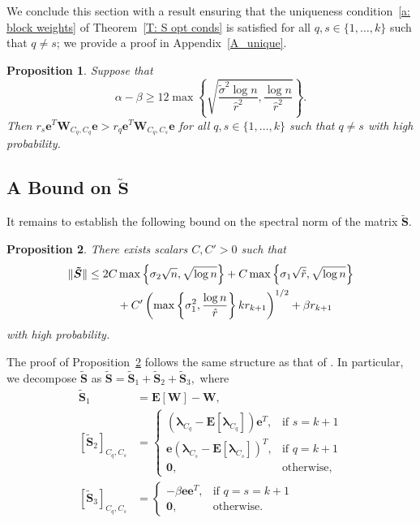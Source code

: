 \documentclass[twoside,11pt]{article}
\newtheorem{proposition}{Proposition}[section]
\newcommand{\E}{\mathbf{E}}
\newcommand{\St}{\bs{\tilde S}}
\newcommand{\e}{\bs {e}}
\newcommand{\bs}{\boldsymbol}
\newcommand{\W}{\bs {W}}
\newcommand{\0}{\bs{0}}
\newcommand{\sbra}[1] {\ensuremath{ \left[ #1\right]}} %
\newcommand{\rbra}[1]{\ensuremath{\left( #1 \right)}} %
\newcommand{\bra}[1]{\ensuremath{\left\{ #1 \right\}}} %
\begin{document}
{%
We conclude this section with a result ensuring that the uniqueness condition~\eqref{a: block weights} of 
Theorem~\ref{T: S opt conds}
is satisfied for all \(q, s\in \{1,\dots, k\}\) such that \(q \neq s\); 
we provide a proof in Appendix~\ref{A_unique}.

\begin{proposition} 
\label{prop:unique}%
	Suppose that
	\begin{equation} \label{eq: unique bound}
		\alpha - \beta \ge
		12 \max \bra{ \sqrt{ \frac{\tilde \sigma^2 \log n}{\hat r^2}, 
		\frac{\log n}{\hat r^2} } }.
	\end{equation}
	Then \(r_s \e^T \W_{C_q, C_q} \e > r_q \e^T \W_{C_q, C_s} \e \)
	for all \(q,s \in \{1,\dots, k\}\) such that \(q \neq s\) with high probability.
\end{proposition}

\subsection{A Bound on \(\bs{\tilde S}\)}
\label{sec: S}
It remains to establish the following bound on the spectral norm of the matrix \(\St\).

\begin{proposition} \label{prop: S bound}
	There exists scalars $C, C' > 0$ such that
	\begin{align} 
	\|\St\| \leq 2 C &  \max \left\lbrace \sigma_2\sqrt{n},  \sqrt{\log n} \right\rbrace 
	+ C \max\left\lbrace \sigma_1\sqrt{ \tilde{r} }, \sqrt{ \log n} \right\rbrace  \notag \\
	&+ C' \rbra{ \max \bra{\sigma_1^2, \frac{\log n}{\hat r} } k r_{k+1} }^{1/2}
	+ \beta r_{k+1}
	\label{eq: S bound}	
	\end{align}
	with high probability.
\end{proposition}

The proof of Proposition~\ref{prop: S bound} follows the same structure as that of  \citet[Lemma~4.5]{ames2014guaranteed}.
In particular, we decompose \(\St\) as \(\St = \St_1 + \St_2 + \St_3,\) where
\begin{align}
\St_1 & = \E[ \W ] - \W,  \label{eq: St1 def}\\
[\St_2]_{C_q, C_s} & = 
\begin{cases}  \left(\bs{\lambda}_{C_q}-\E\sbra{\bs{\lambda}_{C_q}}\right)\bs{e}^T, 
& \mbox{if } s = k+1 \\
\bs{e}\left(\bs{\lambda}_{C_s}-\E\sbra{\bs{\lambda}_{C_s}}\right)^T, & \mbox{if } q = k+1  \\
\bs{0}, & \mbox{otherwise, }\end{cases} \label{eq: St2 def} \\
[\St_3]_{C_q, C_s} &= 	\begin{cases} -\beta \bs{e}\bs{e}^T, & \mbox{if } q=s=k+1 \\
\bs{0}, & \mbox{otherwise.} \end{cases}
\end{align}        

}
\end{document}

